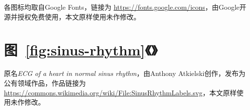 \begin{appendix}
    各图标均取自Google Fonts，链接为 \url{https://fonts.google.com/icons}，由Google开源并授权免费使用，本文原样使用未作修改。

    \section*{图~\ref{fig:sinus-rhythm}《》}

    原名\textit{ECG of a heart in normal sinus rhythm}，由Anthony Atkielski创作，发布为公有领域作品，作品链接为 \url{https://commons.wikimedia.org/wiki/File:SinusRhythmLabels.svg}，本文原样使用未作修改。

\end{appendix}
